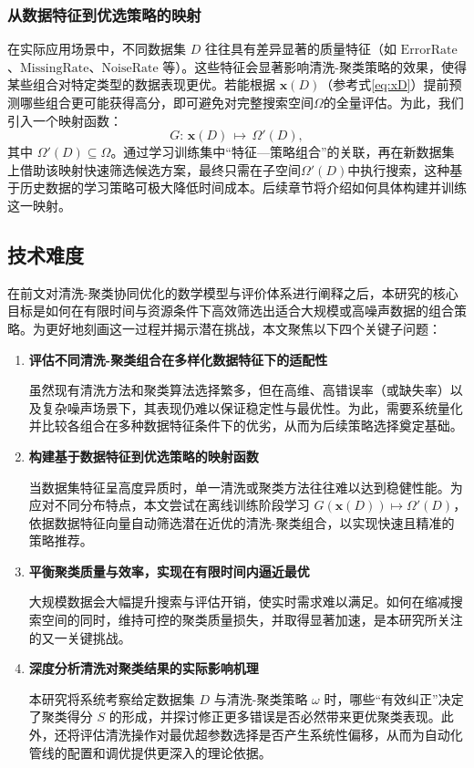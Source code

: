 \documentclass[10pt]{article} %
\numberwithin{equation}{section}
\begin{document}
\subsubsection{从数据特征到优选策略的映射}
在实际应用场景中，不同数据集 \(D\) 往往具有差异显著的质量特征（如 \(\mathrm{ErrorRate}\)、\(\mathrm{MissingRate}\)、\(\mathrm{NoiseRate}\) 等）。这些特征会显著影响清洗-聚类策略的效果，使得某些组合对特定类型的数据表现更优。若能根据 \(\mathbf{x}(D)\)（参考式\eqref{eq:xD}）提前预测哪些组合更可能获得高分，即可避免对完整搜索空间\(\Omega\)的全量评估。为此，我们引入一个映射函数：
\begin{equation}\label{eq:Omega-prime}
  G:\, \mathbf{x}(D)\,\mapsto\, \Omega'(D),
\end{equation}
其中 \(\Omega'(D)\subseteq \Omega\)。通过学习训练集中“特征—策略组合”的关联，再在新数据集上借助该映射快速筛选候选方案，最终只需在子空间\(\Omega'(D)\)中执行搜索，这种基于历史数据的学习策略可极大降低时间成本\cite{10.14778/3407790.3407801}。后续章节将介绍如何具体构建并训练这一映射。

\subsection{技术难度}\label{subsec:problem-statement}

在前文对清洗-聚类协同优化的数学模型与评价体系进行阐释之后，本研究的核心目标是如何在有限时间与资源条件下高效筛选出适合大规模或高噪声数据的组合策略。为更好地刻画这一过程并揭示潜在挑战，本文聚焦以下四个关键子问题：

\begin{enumerate}[label=($Q_{\arabic*}$), leftmargin=25pt]
    \item \textbf{评估不同清洗-聚类组合在多样化数据特征下的适配性}

    虽然现有清洗方法和聚类算法选择繁多，但在高维、高错误率（或缺失率）以及复杂噪声场景下，其表现仍难以保证稳定性与最优性。为此，需要系统量化并比较各组合在多种数据特征条件下的优劣，从而为后续策略选择奠定基础。

    \item \textbf{构建基于数据特征到优选策略的映射函数}

    当数据集特征呈高度异质时，单一清洗或聚类方法往往难以达到稳健性能。为应对不同分布特点，本文尝试在离线训练阶段学习 
    \(G(\mathbf{x}(D)) \mapsto \Omega'(D)\)，依据数据特征向量自动筛选潜在近优的清洗-聚类组合，以实现快速且精准的策略推荐。

    \item \textbf{平衡聚类质量与效率，实现在有限时间内逼近最优}

    大规模数据会大幅提升搜索与评估开销，使实时需求难以满足。如何在缩减搜索空间的同时，维持可控的聚类质量损失，并取得显著加速，是本研究所关注的又一关键挑战。

    \item \textbf{深度分析清洗对聚类结果的实际影响机理}

    本研究将系统考察给定数据集 \(D\) 与清洗-聚类策略 \(\omega\) 时，哪些“有效纠正”决定了聚类得分 \(S\) 的形成，并探讨修正更多错误是否必然带来更优聚类表现。此外，还将评估清洗操作对最优超参数选择是否产生系统性偏移，从而为自动化管线的配置和调优提供更深入的理论依据。
\end{enumerate}
\end{document}

